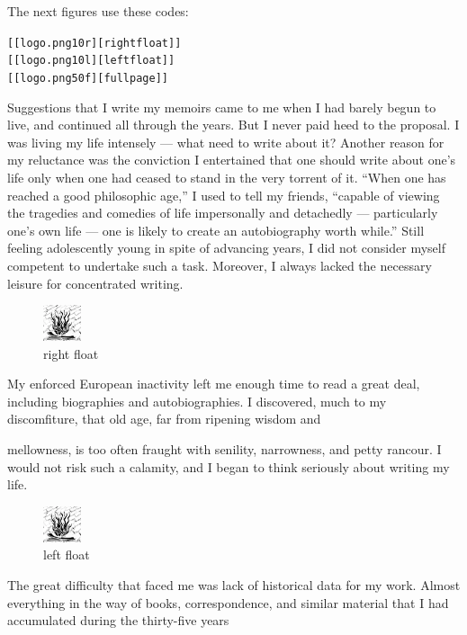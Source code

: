 \documentclass[DIV=12,%
               BCOR=0mm,%
               fontsize=10pt,%
               oneside,%
               paper=210mm:11in]{scrbook}
\begin{document}
The next figures use these codes:


\begin{alltt}
[[logo.png 10r][right float]]
[[logo.png 10l][left float]]
[[logo.png 50f][full page]]

\end{alltt}


Suggestions that I write my memoirs came to me when I had barely begun
to live, and continued all through the years. But I never paid heed to
the proposal. I was living my life intensely — what need to write
about it? Another reason for my reluctance was the conviction I
entertained that one should write about one’s life only when one had
ceased to stand in the very torrent of it. “When one has reached a
good philosophic age,” I used to tell my friends, “capable of viewing
the tragedies and comedies of life impersonally and detachedly —
particularly one’s own life — one is likely to create an autobiography
worth while.” Still feeling adolescently young in spite of advancing
years, I did not consider myself competent to undertake such a task.
Moreover, I always lacked the necessary leisure for concentrated
writing.


\begin{figure}
\centering
\includegraphics[width=0.10\textwidth]{logo.png}
\caption[]{\noindent right float}
\end{figure}


My enforced European inactivity left me enough time to read a great
deal, including biographies and autobiographies. I discovered, much to
my discomfiture, that old age, far from ripening wisdom and


mellowness, is too often fraught with senility, narrowness, and petty
rancour. I would not risk such a calamity, and I began to think
seriously about writing my life.


\begin{figure}
\centering
\includegraphics[width=0.10\textwidth]{logo.png}
\caption[]{\noindent left float}
\end{figure}


The great difficulty that faced me was lack of historical data for my
work. Almost everything in the way of books, correspondence, and
similar material that I had accumulated during the thirty-five years
\end{document}
